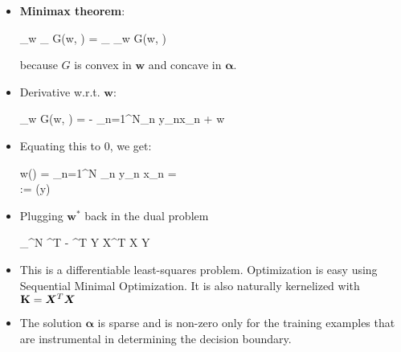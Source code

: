 \begin{itemize}
\begin{itemize}
		\item \textbf{Minimax theorem}: 
		\begin{myalign*}
		    \min_{\bm w} \max_{\bm \alpha} G(\bm w, \bm \alpha) = \max_{\bm \alpha} \min_{\bm w} G(\bm w, \bm \alpha)
		\end{myalign*}
		because $G$ is convex in $\bm w$ and concave in $\bm \alpha$.
		\item Derivative w.r.t. $\bm w$:
		\begin{myalign*}
		    \bm \nabla_{\bm w} G(\bm w, \bm \alpha) = - \sum_{n=1}^N\alpha_n y_n\bm x_n + \lambda \bm w
		\end{myalign*}
		\item Equating this to 0, we get:
			\begin{myalign*}
			  \bm w(\bm \alpha) =  \sum_{n=1}^N \alpha_n y_n \bm x_n =  \bm \alpha \\
			   := \text{diag}(\bm y)
			\end{myalign*}
		\item Plugging $\bm w^*$ back in the dual problem
		\begin{myalign*}
		    \max_{\bm \alpha \in [0, 1]^N} \bm \alpha^T  -  \bm \alpha^T \*Y \bm X^T \bm X \* Y \bm \alpha
		\end{myalign*}
		\item This is a differentiable least-squares problem. Optimization is easy using Sequential Minimal Optimization. It is also naturally kernelized with $\mathbf{K} = \bm X^T \bm X$
		\item The solution $\bm \alpha$ is sparse and is non-zero only for the training examples that are instrumental in determining the decision boundary.
	\end{itemize}
\end{itemize}


